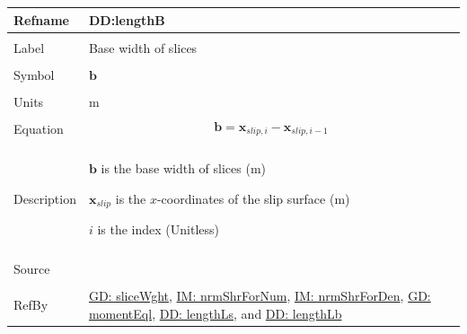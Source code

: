 \documentclass[12pt]{article}
\begin{document}
\vspace{\baselineskip}
\noindent
\begin{minipage}{\textwidth}
\begin{tabular}{>{\raggedright}p{}>{\raggedright\arraybackslash}p{}}
\toprule \textbf{Refname} & \textbf{DD:lengthB}
\label{DD:lengthB}
\\ \midrule \\
Label & Base width of slices
        
\\ \midrule \\
Symbol & $\mathbf{b}$
         
\\ \midrule \\
Units & m
        
\\ \midrule \\
Equation & \begin{displaymath}
           \mathbf{b}={\mathbf{x}_{slip,i}}-{\mathbf{x}_{slip,i-1}}
           \end{displaymath}
\\ \midrule \\
Description & \begin{symbDescription}
              \item{$\mathbf{b}$ is the base width of slices (m)}
              \item{${\mathbf{x}_{slip}}$ is the $x$-coordinates of the slip surface (m)}
              \item{$i$ is the index (Unitless)}
              \end{symbDescription}
\\ \midrule \\
Source & \cite{fredlund1977}
         
\\ \midrule \\
RefBy & \hyperref[GD:sliceWght]{GD: sliceWght}, \hyperref[IM:nrmShrForNum]{IM: nrmShrForNum}, \hyperref[IM:nrmShrForDen]{IM: nrmShrForDen}, \hyperref[GD:momentEql]{GD: momentEql}, \hyperref[DD:lengthLs]{DD: lengthLs}, and \hyperref[DD:lengthLb]{DD: lengthLb}
        
\\ \bottomrule
\end{tabular}
\end{minipage}
\end{document}
